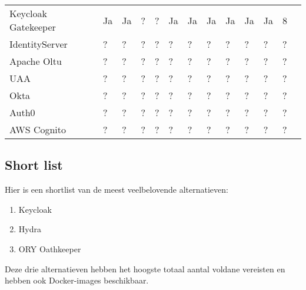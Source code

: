 \begin{table}[htbp]
\begin{adjustbox}{width=1\textwidth}
\begin{tabular}{@{}lllllllllllll@{}}
    Keycloak Gatekeeper & Ja       & Ja        & ?                   & ?               & Ja               & Ja             & Ja         & Ja         & Ja             & Ja          & 8      \\
    IdentityServer & ?             & ?         & ?                   & ?               & ?                & ?              & ?          & ?          & ?              & ?           & ?      \\
    Apache Oltu   & ?             & ?         & ?                   & ?               & ?                & ?              & ?          & ?          & ?              & ?           & ?      \\
    UAA           & ?             & ?         & ?                   & ?               & ?                & ?              & ?          & ?          & ?              & ?           & ?      \\
    Okta          & ?             & ?         & ?                   & ?               & ?                & ?              & ?          & ?          & ?              & ?           & ?      \\
    Auth0         & ?             & ?         & ?                   & ?               & ?                & ?              & ?          & ?          & ?              & ?           & ?      \\
    AWS Cognito   & ?             & ?         & ?                   & ?               & ?                & ?              & ?          & ?          & ?              & ?           & ?      \\
    \bottomrule
  \end{tabular}
  \end{adjustbox}
\end{table}

\subsection{Short list}%
\label{subsec:short-list}
Hier is een shortlist van de meest veelbelovende alternatieven:
\begin{enumerate}
    \item Keycloak
    \item Hydra
    \item ORY Oathkeeper
\end{enumerate}

Deze drie alternatieven hebben het hoogste totaal aantal voldane vereisten en hebben ook Docker-images beschikbaar.

